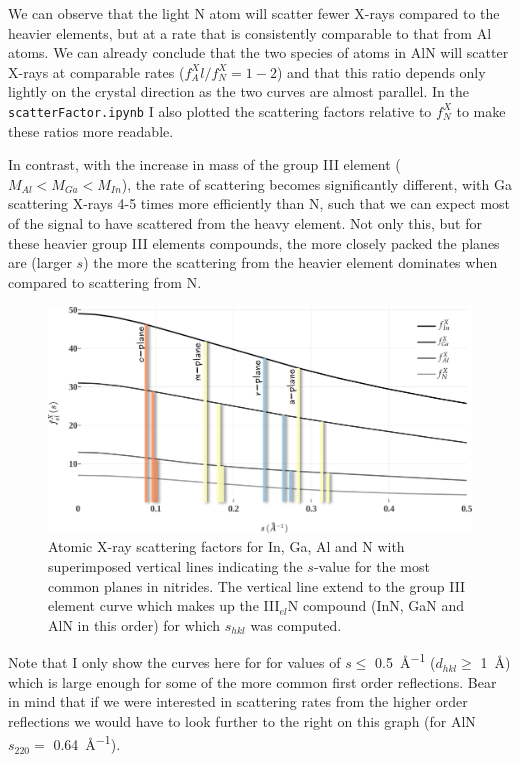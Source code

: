 We can observe that the light N atom will scatter fewer X-rays compared to the heavier elements, but at a rate that is consistently comparable to that from Al atoms. We can already conclude that the two species of atoms in AlN will scatter X-rays at comparable rates ($f^X_Al / f^X_N = 1-2 $) and that this ratio depends only lightly on the crystal direction as the two curves are almost parallel. In the \texttt{scatterFactor.ipynb} I also plotted the scattering factors relative to $f^X_{N}$ to make these ratios more readable.  

In contrast, with the increase in mass of the group III element ($M_{Al}<M_{Ga}<M_{In}$), the rate of scattering becomes significantly different, with Ga scattering X-rays 4-5 times more efficiently than N, such that we can expect most of the signal to have scattered from the heavy element. Not only this, but for these heavier group III elements compounds, the more closely packed the planes are (larger $s$) the more the scattering from the heavier element dominates when compared to scattering from N.


\begin{figure}
    \centering
\includegraphics[width=1\linewidth]{Figures/scatterFactorX.png}
\caption[Atomic X-ray scattering factors.]{Atomic X-ray scattering factors for In, Ga, Al and N with superimposed vertical lines indicating the $s$-value for the most common planes in nitrides. The vertical line extend to the group III element curve which makes up the III$_{el}$N compound (\ie InN, GaN and AlN in this order) for which $s_{hkl}$ was computed.}
\label{Fig:scatterFactorX}
\end{figure}

Note that I only show the curves here for for values of $s\leq$ \SI{0.5}{\angstrom^{-1}} ($d_{hkl}\geq$ \SI{1}{\angstrom}) which is large enough for some of the more common first order reflections. Bear in mind that if we were interested in scattering rates from the higher order reflections we would have to look further to the right on this graph (for AlN $s_{220} = $ \SI{0.64}{\angstrom^{-1}}).






